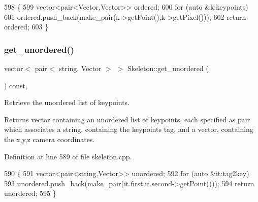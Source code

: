 \begin{DoxyCode}
598 \{
599     vector<pair<Vector,Vector>> ordered;
600     \textcolor{keywordflow}{for} (\textcolor{keyword}{auto} &k:keypoints)
601         ordered.push\_back(make\_pair(k->getPoint(),k->getPixel()));
602     \textcolor{keywordflow}{return} ordered;
603 \}
\end{DoxyCode}
\mbox{\label{classassistive__rehab_1_1Skeleton_a7b9f01b2b0f5450920335347c5861a2f}} 
\subsubsection{\texorpdfstring{get\+\_\+unordered()}{get\_unordered()}}
{\footnotesize\ttfamily vector$<$ pair$<$ string, Vector $>$ $>$ Skeleton\+::get\+\_\+unordered (\begin{DoxyParamCaption}{ }\end{DoxyParamCaption}) const\hspace{0.3cm}{\ttfamily [virtual]}, {\ttfamily [inherited]}}



Retrieve the unordered list of keypoints. 

\begin{DoxyReturn}{Returns}
vector containing an unordered list of keypoints, each specified as pair which associates a string, containing the keypoint\textquotesingle{}s tag, and a vector, containing the x,y,z camera coordinates. 
\end{DoxyReturn}


Definition at line 589 of file skeleton.\+cpp.


\begin{DoxyCode}
590 \{
591     vector<pair<string,Vector>> unordered;
592     \textcolor{keywordflow}{for} (\textcolor{keyword}{auto} &it:tag2key)
593         unordered.push\_back(make\_pair(it.first,it.second->getPoint()));
594     \textcolor{keywordflow}{return} unordered;
595 \}
\end{DoxyCode}
\mbox{\label{classassistive__rehab_1_1Skeleton_a513a3dc56d55a7b10b256378ae63c6c7}} 
